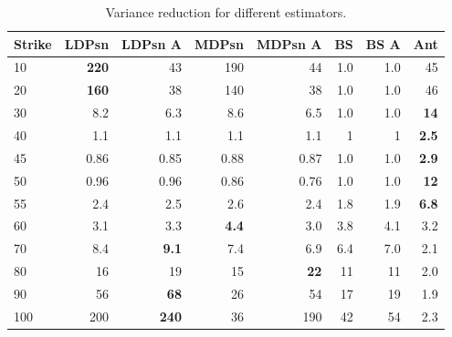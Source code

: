 \begin{table}[H]
\centering
\begin{tabular}{lrrrrrrr}
\toprule
Strike &  LDPsn &  LDPsn A &  MDPsn &  MDPsn A &  BS &  BS A &  Ant \\
\midrule
10  &    \textbf{220} &       43 &    190 &       44 & 1.0 &   1.0 &   45 \\
20  &    \textbf{160} &       38 &    140 &       38 & 1.0 &   1.0 &   46 \\
30  &    8.2 &      6.3 &    8.6 &      6.5 & 1.0 &   1.0 &   \textbf{14} \\
40  &    1.1 &      1.1 &    1.1 &      1.1 &   1 &     1 &  \textbf{2.5} \\
45  &   0.86 &     0.85 &   0.88 &     0.87 & 1.0 &   1.0 &  \textbf{2.9} \\
50  &   0.96 &     0.96 &   0.86 &     0.76 & 1.0 &   1.0 &   \textbf{12} \\
55  &    2.4 &      2.5 &    2.6 &      2.4 & 1.8 &   1.9 &  \textbf{6.8} \\
60  &    3.1 &      3.3 &    \textbf{4.4} &      3.0 & 3.8 &   4.1 &  3.2 \\
70  &    8.4 &  \textbf{9.1} &    7.4 &      6.9 & 6.4 &   7.0 &  2.1 \\
80  &     16 &  19 &     15 &       \textbf{22} &  11 &    11 &  2.0 \\
90  &     56 &  \textbf{68} &     26 &       54 &  17 &    19 &  1.9 \\
100 &    200 &      \textbf{240} &     36 &      190 &  42 &    54 &  2.3 \\
\bottomrule
\end{tabular}
\caption{Variance reduction for different estimators.}\label{tab:VarSwap}
\end{table}

